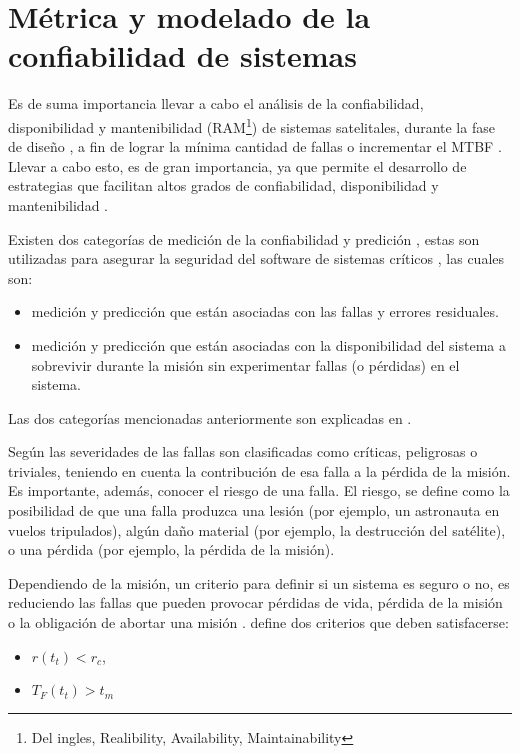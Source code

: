 \section{Métrica y modelado de la confiabilidad de sistemas}
Es de suma importancia llevar a cabo el análisis de la confiabilidad, disponibilidad y mantenibilidad (RAM\footnote{Del ingles, Realibility, Availability, Maintainability}) de sistemas satelitales, durante la fase de diseño \citep{Hoque15}, a fin de lograr la mínima cantidad de fallas o incrementar el \ac{MTBF} \citep{Peng13}. Llevar a cabo esto, es de gran importancia, ya que permite el desarrollo de estrategias que facilitan altos grados de confiabilidad, disponibilidad y mantenibilidad \citep{Hoque15}.

Existen dos categorías de medición de la confiabilidad y predición \citep{Schneidewind97}, estas son utilizadas para asegurar la seguridad del software de sistemas críticos \citep{Schneidewind97}, las cuales son:
  \begin{itemize}
    \item medición y predicción que están asociadas con las fallas y errores residuales.
    \item medición y predicción que están asociadas con la disponibilidad del sistema a sobrevivir durante la misión sin experimentar fallas
      (o pérdidas) en el sistema.
  \end{itemize}

  Las dos categorías mencionadas anteriormente son explicadas en \cite{Schneidewind97}.

  Según \cite{Liu14} las severidades de las fallas son clasificadas como críticas, peligrosas o triviales, teniendo en cuenta la contribución de esa falla a la pérdida de la misión. Es importante, además, conocer el riesgo de una falla. El riesgo, se define como la posibilidad de que una falla produzca una lesión (por ejemplo, un astronauta en vuelos tripulados), algún daño material (por ejemplo, la destrucción del satélite), o una pérdida (por ejemplo, la pérdida de la misión).

  Dependiendo de la misión, un criterio para definir si un sistema es seguro o no, es reduciendo las fallas que pueden provocar pérdidas de vida, pérdida de la misión o la obligación de abortar una misión \citep{Schneidewind97}. \cite{Schneidewind97} define dos criterios que deben satisfacerse:
  \begin{itemize}
    \item $r(t_t) < r_c$,
    \item $T_F(t_t) > t_m$
  \end{itemize}

